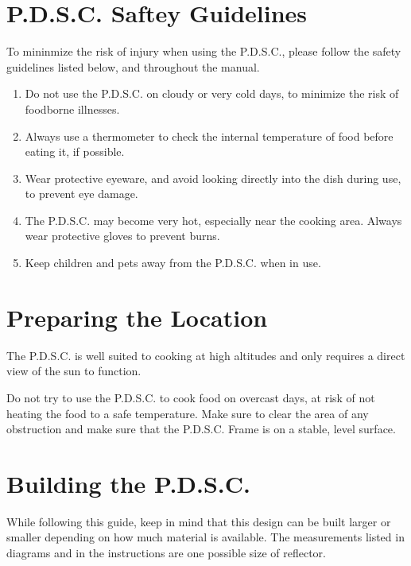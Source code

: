 \documentclass[titlepage]{article}
\begin{document}
    \section{P.D.S.C. Saftey Guidelines}
        To mininmize the risk of injury when using the P.D.S.C., please follow the safety guidelines listed below, and throughout the manual.
        \begin{enumerate}
            \item Do not use the P.D.S.C. on cloudy or very cold days, to minimize the risk of foodborne illnesses.
            \item Always use a thermometer to check the internal temperature of food before eating it, if possible.
            \item Wear protective eyeware, and avoid looking directly into the dish during use, to prevent eye damage.
            \item The P.D.S.C. may become very hot, especially near the cooking area.  Always wear protective gloves to prevent burns.
            \item Keep children and pets away from the P.D.S.C. when in use.
        \end{enumerate}
    \section{Preparing the Location}
        The P.D.S.C. is well suited to cooking at high altitudes and only requires
        a direct view of the sun to function.  
        
        Do not try to use the P.D.S.C. to cook food 
        on overcast days, at risk of not heating the food to a safe temperature. 
        Make sure to clear the area of any obstruction and make sure that the P.D.S.C. Frame is 
        on a stable, level surface.

    \section{Building the P.D.S.C.}
        While following this guide, keep in mind that this design can be built
        larger or smaller depending on how much material is available.  The measurements listed
        in diagrams and in the instructions are one possible size of reflector. 
        
\end{document}
